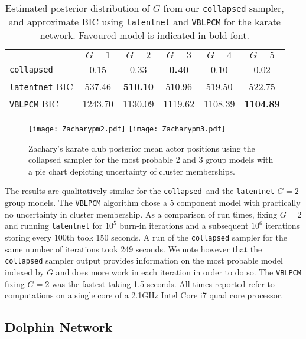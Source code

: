 \documentclass[12pt]{article}
\begin{document}
\begin{table}[htp]
\begin{center}
\begin{tabular}{| l|c|c|c|c|c|}
\hline
 & $G=1$ & $G=2$ & $G=3$ & $G=4$ & $G=5$ \\
\hline
	\texttt{collapsed} & 0.15 & 0.33 & \bf{0.40}  & 0.10  & 0.02  \\
  \texttt{latentnet} BIC & 537.46 & \bf{510.10} & 510.96 & 519.50 & 522.75 \\ 
  \texttt{VBLPCM} BIC & 1243.70  & 1130.09   & 1119.62  & 1108.39 & \bf{1104.89}\\ 
  \hline
\end{tabular}
\caption{Estimated posterior distribution of $G$ from our \texttt{collapsed} sampler, and approximate BIC using \texttt{latentnet} and \texttt{VBLPCM} for the karate network. Favoured model is indicated in bold font.}
\label{tab:pallzac}
\end{center}
\end{table}


\begin{figure}
 \begin{center}
\texttt{[image: Zacharypm2.pdf]} 
\texttt{[image: Zacharypm3.pdf]} 
 \end{center}
 \caption{Zachary's karate club posterior mean actor positions using the collapsed sampler for the most probable  $2$ and $3$ group models with a pie chart depicting uncertainty of cluster memberships.}
\label{zmeanpiezac}
\end{figure}



The results are qualitatively similar for the \texttt{collapsed }and the \texttt{latentnet} $G=2$ group models. 
The \texttt{VBLPCM} algorithm chose a $5$ component model with practically no uncertainty in cluster membership. As a comparison of run times, fixing $G=2$ and running \texttt{latentnet} for $10^5$ burn-in iterations and a subsequent $10^6$ iterations storing every $100$th took 150 seconds. A run of the \texttt{collapsed} sampler for the same number of iterations took 249 seconds. We note however that the \texttt{collapsed} sampler output provides information on the most probable model indexed by $G$ and does more work in each iteration in order to do so. The \texttt{VBLPCM} fixing $G=2$ was the fastest taking 1.5 seconds. All times reported refer to computations on a single core of a 2.1GHz Intel Core i7 quad core processor.

\subsection{Dolphin Network}
\end{document}
